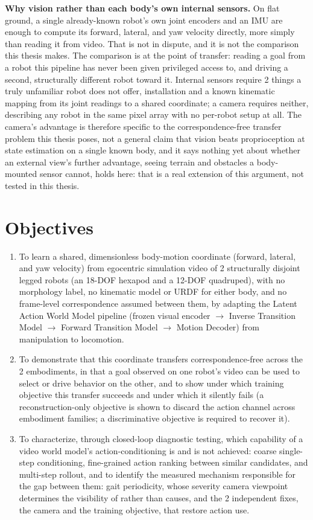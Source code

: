 \documentclass[12pt,a4paper,oneside]{report}
\begin{document}
\noindent\textbf{Why vision rather than each body's own internal sensors.} On flat ground, a single already-known
robot's own joint encoders and an IMU are enough to compute its forward, lateral, and yaw velocity directly, more
simply than reading it from video. That is not in dispute, and it is not the comparison this thesis makes. The
comparison is at the point of transfer: reading a goal from a robot this pipeline has never been given privileged
access to, and driving a second, structurally different robot toward it. Internal sensors require 2 things a truly
unfamiliar robot does not offer, installation and a known kinematic mapping from its joint readings to a shared
coordinate; a camera requires neither, describing any robot in the same pixel array with no per-robot setup at all.
The camera's advantage is therefore specific to the correspondence-free transfer problem this thesis poses, not a
general claim that vision beats proprioception at state estimation on a single known body, and it says nothing yet
about whether an external view's further advantage, seeing terrain and obstacles a body-mounted sensor cannot, holds
here: that is a real extension of this argument, not tested in this thesis.

\newpage
\section{Objectives}
\begin{enumerate}[label=\arabic*.]
\item To learn a shared, dimensionless body-motion coordinate (forward, lateral, and yaw velocity) from egocentric
  simulation video of 2 structurally disjoint legged robots (an 18-DOF hexapod and a 12-DOF quadruped), with no
  morphology label, no kinematic model or URDF for either body, and no frame-level correspondence assumed between
  them, by adapting the Latent Action World Model pipeline (frozen visual encoder $\to$ Inverse Transition Model
  $\to$ Forward Transition Model $\to$ Motion Decoder) from manipulation to locomotion.
\item To demonstrate that this coordinate transfers correspondence-free across the 2 embodiments, in that
  a goal observed on one robot's video can be used to select or drive behavior on the other, and to show
  under which training objective this transfer succeeds and under which it silently fails (a reconstruction-only
  objective is shown to discard the action channel across embodiment families; a discriminative objective is
  required to recover it).
\item To characterize, through closed-loop diagnostic testing, which capability of a video world model's
  action-conditioning is and is not achieved: coarse single-step conditioning, fine-grained action ranking between
  similar candidates, and multi-step rollout, and to identify the measured mechanism responsible for the gap
  between them: gait periodicity, whose severity camera viewpoint determines the visibility of rather than causes,
  and the 2 independent fixes, the camera and the training objective, that restore action use.
\end{enumerate}
\end{document}
